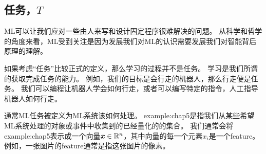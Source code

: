 \subsection{任务，$T$}
\label{sec:the_task_t}
\gls{ML}可以让我们应对一些由人来写和设计固定程序很难解决的问题。
从科学和哲学的角度来看，\gls{ML}受到关注是因为发展我们对\gls{ML}的认识需要发展我们对智能背后原理的理解。

如果考虑``任务''比较正式的定义，那么学习的过程并不是任务。
学习是我们所谓的获取完成任务的能力。
例如，我们的目标是会行走的机器人，那么行走便是任务。
我们可以编程让机器人学会如何行走，或者可以编写特定的指令，人工指导机器人如何行走。

通常\gls{ML}任务被定义为\gls{ML}系统该如何处理。
\gls{example:chap5}是指我们从某些希望\gls{ML}系统处理的对象或事件中收集到的已经量化的的集合。
我们通常会将\gls{example:chap5}表示成一个向量$\boldsymbol{\mathit{x}}\in\mathbb{R}^n$，其中向量的每一个元素$x_i$是一个\gls{feature}。
例如，一张图片的\gls{feature}通常是指这张图片的像素。


